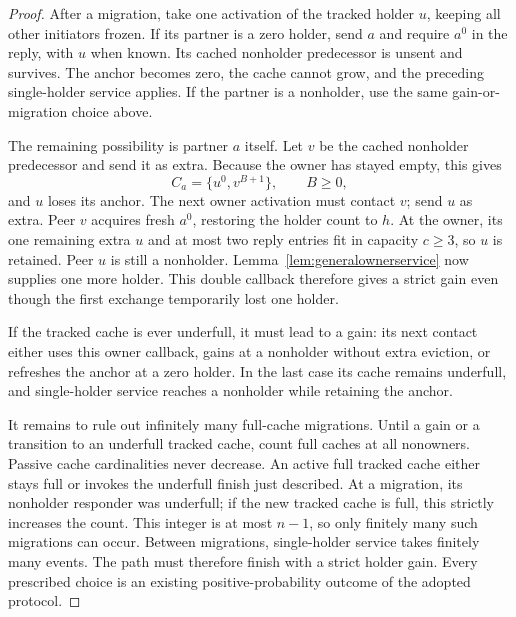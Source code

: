 \documentclass[11pt]{article}
\begin{document}
\begin{proof}
After a migration, take one activation of the tracked
holder $u$, keeping all other initiators frozen. If its
partner is a zero holder, send $a$ and require $a^0$ in
the reply, with $u$ when known. Its cached nonholder
predecessor is unsent and survives. The anchor becomes
zero, the cache cannot grow, and the preceding
single-holder service applies. If the partner is a
nonholder, use the same gain-or-migration choice above.

The remaining possibility is partner $a$ itself. Let $v$
be the cached nonholder predecessor and send it as extra.
Because the owner has stayed empty, this gives
\[
 C_a=\{u^0,v^{B+1}\},\qquad B\ge0,
\]
and $u$ loses its anchor. The next owner activation must
contact $v$; send $u$ as extra. Peer $v$ acquires fresh
$a^0$, restoring the holder count to $h$. At the owner,
its one remaining extra $u$ and at most two reply entries
fit in capacity $c\ge3$, so $u$ is retained. Peer $u$
is still a nonholder. Lemma~\ref{lem:generalownerservice}
now supplies one more holder. This double callback
therefore gives a strict gain even though the first
exchange temporarily lost one holder.

If the tracked cache is ever underfull, it must lead
to a gain: its next contact either uses this owner
callback, gains at a nonholder without extra eviction,
or refreshes the anchor at a zero holder. In the last
case its cache remains underfull, and single-holder
service reaches a nonholder while retaining the anchor.

It remains to rule out infinitely many full-cache
migrations. Until a gain or a transition to an underfull
tracked cache, count full caches at all nonowners.
Passive cache cardinalities never decrease. An active
full tracked cache either stays full or invokes the
underfull finish just described. At a migration, its
nonholder responder was underfull; if the new tracked
cache is full, this strictly increases the count.
This integer is at most $n-1$, so only finitely many
such migrations can occur. Between migrations,
single-holder service takes finitely many events.
The path must therefore finish with a strict holder gain.
Every prescribed choice is an existing positive-probability
outcome of the adopted protocol.
\end{proof}
\end{document}

